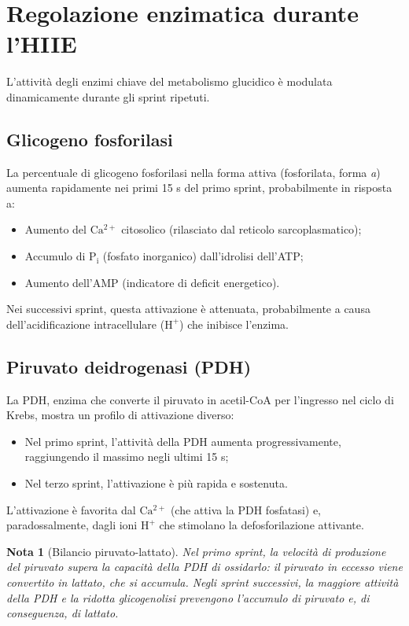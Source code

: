 \documentclass[12pt,a4paper]{report}
\newtheorem{nota}{Nota}[section]
\begin{document}
\section{Regolazione enzimatica durante l'HIIE}
L'attività degli enzimi chiave del metabolismo glucidico è modulata dinamicamente durante gli sprint ripetuti.
\subsection{Glicogeno fosforilasi}
La percentuale di glicogeno fosforilasi nella forma attiva (fosforilata, forma \textit{a}) aumenta rapidamente nei primi 15 s del primo sprint, probabilmente in risposta a:
\begin{itemize}
\item Aumento del \(\mathrm{Ca^{2+}}\) citosolico (rilasciato dal reticolo sarcoplasmatico);
\item Accumulo di \(\mathrm{P_i}\) (fosfato inorganico) dall'idrolisi dell'ATP;
\item Aumento dell'AMP (indicatore di deficit energetico).
\end{itemize}
Nei successivi sprint, questa attivazione è attenuata, probabilmente a causa dell'acidificazione intracellulare (\(\mathrm{H^+}\)) che inibisce l'enzima.
\subsection{Piruvato deidrogenasi (PDH)}
La PDH, enzima che converte il piruvato in acetil-CoA per l'ingresso nel ciclo di Krebs, mostra un profilo di attivazione diverso:
\begin{itemize}
\item Nel primo sprint, l'attività della PDH aumenta progressivamente, raggiungendo il massimo negli ultimi 15 s;
\item Nel terzo sprint, l'attivazione è più rapida e sostenuta.
\end{itemize}
L'attivazione è favorita dal \(\mathrm{Ca^{2+}}\) (che attiva la PDH fosfatasi) e, paradossalmente, dagli ioni \(\mathrm{H^+}\) che stimolano la defosforilazione attivante.
\begin{nota}[Bilancio piruvato-lattato]
Nel primo sprint, la velocità di produzione del piruvato supera la capacità della PDH di ossidarlo: il piruvato in eccesso viene convertito in lattato, che si accumula. Negli sprint successivi, la maggiore attività della PDH e la ridotta glicogenolisi prevengono l'accumulo di piruvato e, di conseguenza, di lattato.
\end{nota}
\end{document}
